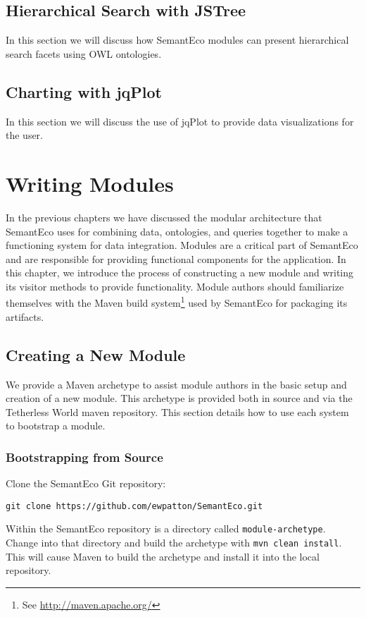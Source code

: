 \documentclass[letterpaper]{report}
\begin{document}
\section{Hierarchical Search with JSTree}
\label{hierarchical-search}
In this section we will discuss how SemantEco modules can present hierarchical search facets using OWL ontologies.
\section{Charting with jqPlot}
\label{visualization}
In this section we will discuss the use of jqPlot to provide data visualizations for the user.

\chapter{Writing Modules}
\label{writing-modules}
In the previous chapters we have discussed the modular architecture that SemantEco uses for combining data, ontologies, and queries together to make a functioning system for data integration. Modules are a critical part of SemantEco and are responsible for providing functional components for the application. In this chapter, we introduce the process of constructing a new module and writing its visitor methods to provide functionality. Module authors should familiarize themselves with the Maven build system\footnote{See \url{http://maven.apache.org/}} used by SemantEco for packaging its artifacts. 

\section{Creating a New Module}
We provide a Maven archetype to assist module authors in the basic setup and creation of a new module. This archetype is provided both in source and via the Tetherless World maven repository. This section details how to use each system to bootstrap a module.

\subsection{Bootstrapping from Source}
Clone the SemantEco Git repository:

\begin{verbatim}
git clone https://github.com/ewpatton/SemantEco.git
\end{verbatim}

Within the SemantEco repository is a directory called \texttt{module-archetype}. Change into that directory and build the archetype with \texttt{mvn clean install}. This will cause Maven to build the archetype and install it into the local repository.
\end{document}
